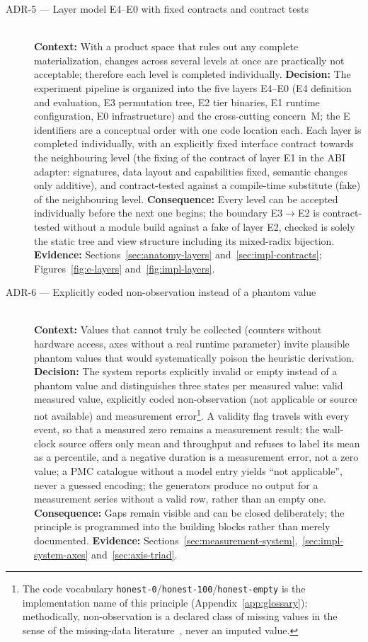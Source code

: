 \begin{description}
  \item[ADR-5 --- Layer model E4--E0 with fixed contracts and contract tests]\hfill\\
  \textbf{Context:} With a product space that rules out any complete materialization, changes
  across several levels at once are practically not acceptable; therefore each level is completed
  individually.
  \textbf{Decision:} The experiment pipeline is organized into the five layers E4--E0 (E4
  definition and evaluation, E3 permutation tree, E2 tier binaries, E1 runtime configuration, E0
  infrastructure) and the cross-cutting concern~M\@; the E identifiers are a conceptual order with
  one code location each. Each layer is completed individually, with an explicitly fixed interface
  contract towards the neighbouring level (the fixing of the contract of layer E1 in the ABI
  adapter: signatures, data layout and capabilities fixed, semantic changes only additive), and
  contract-tested against a compile-time substitute (fake) of the neighbouring level.
  \textbf{Consequence:} Every level can be accepted individually before the next one begins; the
  boundary E3$\to$E2 is contract-tested without a module build against a fake of layer E2, checked
  is solely the static tree and view structure including its mixed-radix bijection.
  \textbf{Evidence:} Sections~\ref{sec:anatomy-layers} and~\ref{sec:impl-contracts};
  Figures~\ref{fig:e-layers} and~\ref{fig:impl-layers}.

  \item[ADR-6 --- Explicitly coded non-observation instead of a phantom value]\hfill\\
  \textbf{Context:} Values that cannot truly be collected (counters without hardware access, axes
  without a real runtime parameter) invite plausible phantom values that would systematically
  poison the heuristic derivation.
  \textbf{Decision:} The system reports explicitly invalid or empty instead of a phantom value and
  distinguishes three states per measured value: valid measured value, explicitly coded
  non-observation (not applicable or source not available) and measurement error\footnote{The code
  vocabulary \texttt{honest-0}/\texttt{honest-100}/\texttt{honest-empty} is the implementation name
  of this principle (Appendix~\ref{app:glossary}); methodically, non-observation is a declared class
  of missing values in the sense of the missing-data literature~\cite{graham2009missing}, never an
  imputed value.}. A validity flag travels with every event, so that a measured zero remains a
  measurement result; the wall-clock source offers only mean and throughput and refuses to label
  its mean as a percentile, and a negative duration is a measurement error, not a zero value; a PMC
  catalogue without a model entry yields \enquote{not applicable}, never a guessed encoding; the
  generators produce no output for a measurement series without a valid row, rather than an empty
  one.
  \textbf{Consequence:} Gaps remain visible and can be closed deliberately; the principle is
  programmed into the building blocks rather than merely documented.
  \textbf{Evidence:} Sections~\ref{sec:measurement-system},~\ref{sec:impl-system-axes}
  and~\ref{sec:axis-triad}.


\end{description}
